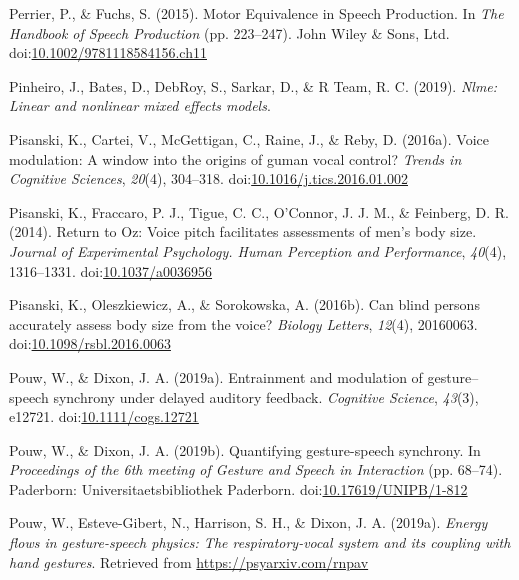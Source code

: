 \documentclass[
  man,floatsintext]{apa6}
\newlength{\cslhangindent}
\newenvironment{cslreferences}%
  {\setlength{\parindent}{0pt}%
  \everypar{\setlength{\hangindent}{\cslhangindent}}\ignorespaces}%
  {\par}
\begin{document}
\begin{cslreferences}
\leavevmode\hypertarget{ref-perrierMotorEquivalenceSpeech2015}{}%
Perrier, P., \& Fuchs, S. (2015). Motor Equivalence in Speech Production. In \emph{The Handbook of Speech Production} (pp. 223--247). John Wiley \& Sons, Ltd. doi:\href{https://doi.org/10.1002/9781118584156.ch11}{10.1002/9781118584156.ch11}

\leavevmode\hypertarget{ref-pinheiroNlmeLinearNonlinear2019}{}%
Pinheiro, J., Bates, D., DebRoy, S., Sarkar, D., \& R Team, R. C. (2019). \emph{Nlme: Linear and nonlinear mixed effects models}.

\leavevmode\hypertarget{ref-pisanskiVoiceModulationWindow2016}{}%
Pisanski, K., Cartei, V., McGettigan, C., Raine, J., \& Reby, D. (2016a). Voice modulation: A window into the origins of guman vocal control? \emph{Trends in Cognitive Sciences}, \emph{20}(4), 304--318. doi:\href{https://doi.org/10.1016/j.tics.2016.01.002}{10.1016/j.tics.2016.01.002}

\leavevmode\hypertarget{ref-pisanskiReturnOzVoice2014}{}%
Pisanski, K., Fraccaro, P. J., Tigue, C. C., O'Connor, J. J. M., \& Feinberg, D. R. (2014). Return to Oz: Voice pitch facilitates assessments of men's body size. \emph{Journal of Experimental Psychology. Human Perception and Performance}, \emph{40}(4), 1316--1331. doi:\href{https://doi.org/10.1037/a0036956}{10.1037/a0036956}

\leavevmode\hypertarget{ref-pisanskiCanBlindPersons2016}{}%
Pisanski, K., Oleszkiewicz, A., \& Sorokowska, A. (2016b). Can blind persons accurately assess body size from the voice? \emph{Biology Letters}, \emph{12}(4), 20160063. doi:\href{https://doi.org/10.1098/rsbl.2016.0063}{10.1098/rsbl.2016.0063}

\leavevmode\hypertarget{ref-pouwEntrainmentModulationGesture2019}{}%
Pouw, W., \& Dixon, J. A. (2019a). Entrainment and modulation of gesture--speech synchrony under delayed auditory feedback. \emph{Cognitive Science}, \emph{43}(3), e12721. doi:\href{https://doi.org/10.1111/cogs.12721}{10.1111/cogs.12721}

\leavevmode\hypertarget{ref-pouwQuantifyingGesturespeechSynchrony2019}{}%
Pouw, W., \& Dixon, J. A. (2019b). Quantifying gesture-speech synchrony. In \emph{Proceedings of the 6th meeting of Gesture and Speech in Interaction} (pp. 68--74). Paderborn: Universitaetsbibliothek Paderborn. doi:\href{https://doi.org/10.17619/UNIPB/1-812}{10.17619/UNIPB/1-812}

\leavevmode\hypertarget{ref-pouwEnergyFlowsGesturespeech2019a}{}%
Pouw, W., Esteve-Gibert, N., Harrison, S. H., \& Dixon, J. A. (2019a). \emph{Energy flows in gesture-speech physics: The respiratory-vocal system and its coupling with hand gestures}. Retrieved from \url{https://psyarxiv.com/rnpav}


\end{cslreferences}
\end{document}
